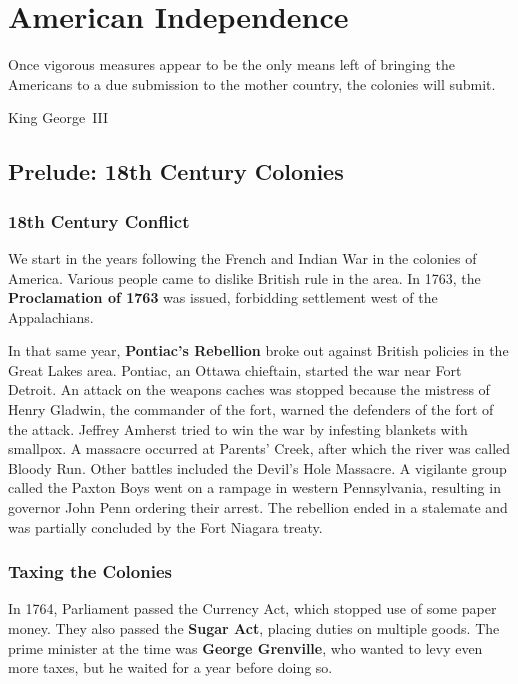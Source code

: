 \chapter{American Independence}

\epigraph{%
  Once vigorous measures appear to be the only means left
  of bringing the Americans to a due submission to the mother country,
  the colonies will submit.
}{King George~III}

\section{Prelude: 18th Century Colonies}

\subsection*{18th Century Conflict}

We start in the years following the French and Indian War in the colonies of America.
Various people came to dislike British rule in the area.
In 1763, the \textbf{Proclamation of 1763} was issued, forbidding settlement west of the Appalachians.

In that same year,
\textbf{Pontiac's Rebellion} broke out against British policies in the Great Lakes area.
Pontiac, an Ottawa chieftain, started the war near Fort Detroit.
An attack on the weapons caches was stopped because the mistress of Henry Gladwin, the commander of the fort,
warned the defenders of the fort of the attack.
Jeffrey Amherst tried to win the war by infesting blankets with smallpox.
A massacre occurred at Parents' Creek, after which the river was called Bloody Run.
Other battles included the Devil's Hole Massacre.
A vigilante group called the Paxton Boys went on a rampage in western Pennsylvania,
resulting in governor John Penn ordering their arrest.
The rebellion ended in a stalemate and was partially concluded by the Fort Niagara treaty.

\subsection*{Taxing the Colonies}

In 1764, Parliament passed the Currency Act, which stopped use of some paper money.
They also passed the \textbf{Sugar Act}, placing duties on multiple goods.
The prime minister at the time was \textbf{George Grenville}, who wanted to levy even more taxes,
but he waited for a year before doing so.

